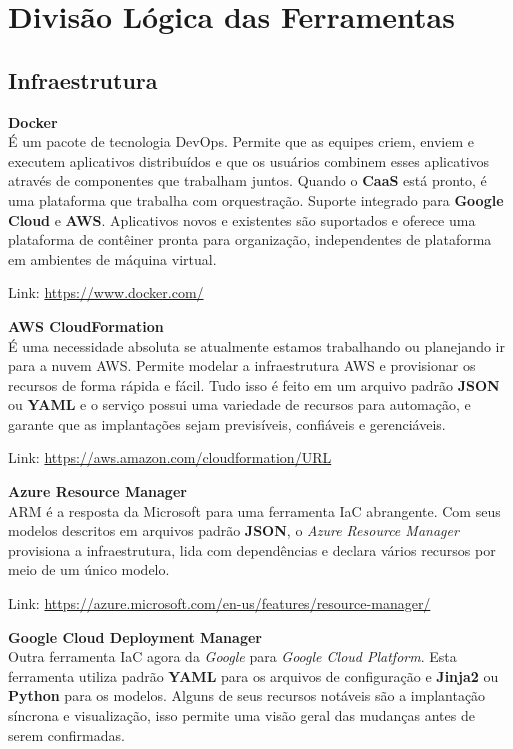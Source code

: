 \documentclass[fleqn,10pt]{../sty/SelfArx} %
\begin{document}
\section*{Divisão Lógica das Ferramentas}

\subsection*{Infraestrutura}

\textbf{Docker} \\
É um pacote de tecnologia DevOps. Permite que as equipes criem, enviem e executem aplicativos distribuídos e que os usuários combinem esses aplicativos através de componentes que trabalham juntos. Quando o \textbf{CaaS} está pronto, é uma plataforma que trabalha com orquestração. Suporte integrado para \textbf{Google Cloud} e \textbf{AWS}. Aplicativos novos e existentes são suportados e oferece uma plataforma de contêiner pronta para organização, independentes de plataforma em ambientes de máquina virtual.

Link: \url{https://www.docker.com/}

\textbf{AWS CloudFormation} \\
É uma necessidade absoluta se atualmente estamos trabalhando ou planejando ir para a nuvem AWS. Permite modelar a infraestrutura AWS e provisionar os recursos de forma rápida e fácil. Tudo isso é feito em um arquivo padrão \textbf{JSON} ou \textbf{YAML} e o serviço possui uma variedade de recursos para automação, e garante que as implantações sejam previsíveis, confiáveis e gerenciáveis.

Link: \url{https://aws.amazon.com/cloudformation/URL}

\textbf{Azure Resource Manager} \\
ARM é a resposta da Microsoft para uma ferramenta IaC abrangente. Com seus modelos descritos em arquivos padrão \textbf{JSON}, o \textit{Azure Resource Manager} provisiona a infraestrutura, lida com dependências e declara vários recursos por meio de um único modelo.

Link: \url{https://azure.microsoft.com/en-us/features/resource-manager/}

\textbf{Google Cloud Deployment Manager} \\
Outra ferramenta IaC agora da \textit{Google} para \textit{Google Cloud Platform}. Esta ferramenta utiliza padrão \textbf{YAML} para os arquivos de configuração e \textbf{Jinja2} ou \textbf{Python} para os modelos. Alguns de seus recursos notáveis são a implantação síncrona e visualização, isso permite uma visão geral das mudanças antes de serem confirmadas.
\end{document}
